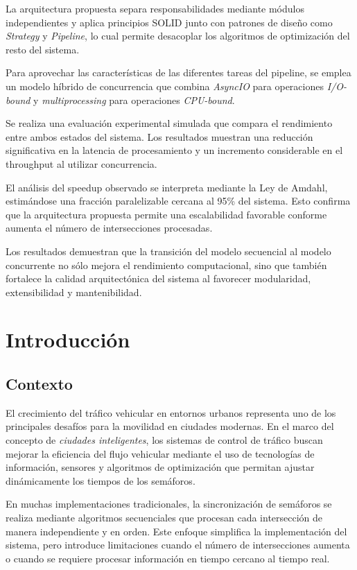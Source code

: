 \documentclass[12pt]{article}
\begin{document}
La arquitectura propuesta separa responsabilidades mediante módulos
independientes y aplica principios SOLID junto con patrones de diseño
como \textit{Strategy} y \textit{Pipeline}, lo cual permite desacoplar
los algoritmos de optimización del resto del sistema.

Para aprovechar las características de las diferentes tareas del
pipeline, se emplea un modelo híbrido de concurrencia que combina
\textit{AsyncIO} para operaciones \textit{I/O-bound} y
\textit{multiprocessing} para operaciones \textit{CPU-bound}.

Se realiza una evaluación experimental simulada que compara el
rendimiento entre ambos estados del sistema. Los resultados muestran
una reducción significativa en la latencia de procesamiento y un
incremento considerable en el throughput al utilizar concurrencia.

El análisis del speedup observado se interpreta mediante la Ley de
Amdahl, estimándose una fracción paralelizable cercana al 95\% del
sistema. Esto confirma que la arquitectura propuesta permite una
escalabilidad favorable conforme aumenta el número de intersecciones
procesadas.

Los resultados demuestran que la transición del modelo secuencial al
modelo concurrente no sólo mejora el rendimiento computacional, sino
que también fortalece la calidad arquitectónica del sistema al
favorecer modularidad, extensibilidad y mantenibilidad.

\section{Introducción}

\subsection{Contexto}

El crecimiento del tráfico vehicular en entornos urbanos representa uno de los principales desafíos para la movilidad en ciudades modernas. En el marco del concepto de \textit{ciudades inteligentes}, los sistemas de control de tráfico buscan mejorar la eficiencia del flujo vehicular mediante el uso de tecnologías de información, sensores y algoritmos de optimización que permitan ajustar dinámicamente los tiempos de los semáforos.

En muchas implementaciones tradicionales, la sincronización de semáforos se realiza mediante algoritmos secuenciales que procesan cada intersección de manera independiente y en orden. Este enfoque simplifica la implementación del sistema, pero introduce limitaciones cuando el número de intersecciones aumenta o cuando se requiere procesar información en tiempo cercano al tiempo real.
\end{document}
